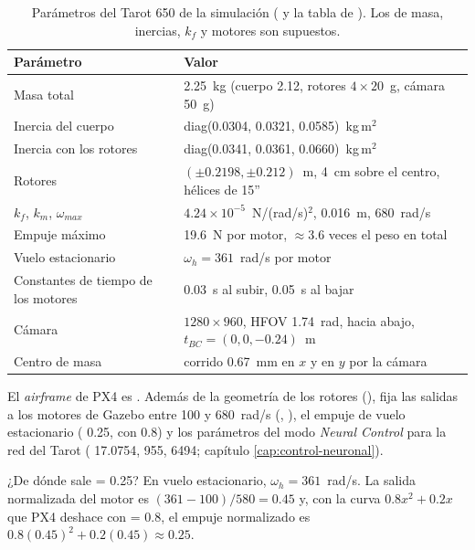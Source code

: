 \begin{table}[H]
\centering\small
\begin{tabular}{ll}
\toprule
\textbf{Parámetro} & \textbf{Valor} \\ \midrule
Masa total & 2.25~kg (cuerpo 2.12, rotores $4\times20$~g, cámara 50~g) \\
Inercia del cuerpo & diag(0.0304, 0.0321, 0.0585)~kg\,m$^2$ \\
Inercia con los rotores & diag(0.0341, 0.0361, 0.0660)~kg\,m$^2$ \\
Rotores & $(\pm0.2198, \pm0.212)$~m, 4~cm sobre el centro, hélices de 15'' \\
$k_f$, $k_m$, $\omega_{max}$ & $4.24\times10^{-5}$~N/(rad/s)$^2$, 0.016~m, 680~rad/s \\
Empuje máximo & 19.6~N por motor, $\approx$3.6 veces el peso en total \\
Vuelo estacionario & $\omega_h = 361$~rad/s por motor \\
Constantes de tiempo de los motores & 0.03~s al subir, 0.05~s al bajar \\
Cámara & $1280\times960$, HFOV 1.74~rad, hacia abajo, $t_{BC} = (0, 0, -0.24)$~m \\
Centro de masa & corrido 0.67~mm en $x$ y en $y$ por la cámara \\
\bottomrule
\end{tabular}
\caption{Parámetros del Tarot 650 de la simulación ( y la tabla
 de ). Los de masa, inercias, $k_f$ y motores son supuestos.}
\end{table}

El \emph{airframe} de PX4 es . Además de la geometría de los rotores
(), fija las salidas a los motores de Gazebo entre 100 y 680~rad/s
(, ), el empuje de vuelo estacionario ( 0.25,
con  0.8) y los parámetros del modo \emph{Neural Control} para la red del Tarot
( 17.0754,  955,  6494; capítulo
\ref{cap:control-neuronal}).

\begin{tecnico}
¿De dónde sale  = 0.25? En vuelo estacionario, $\omega_h = 361$~rad/s. La salida
normalizada del motor es $(361-100)/580 = 0.45$ y, con la curva $0.8x^2 + 0.2x$ que PX4 deshace con
 = 0.8, el empuje normalizado es $0.8(0.45)^2 + 0.2(0.45) \approx 0.25$.
\end{tecnico}


